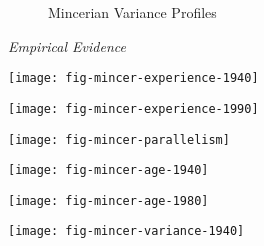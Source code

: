 \begin{frame}
\begin{figure}[htp]\centering
\caption{Mincerian Variance Profiles}\label{Mincerian Variance Profiles}
\end{figure}
\end{frame}

\begin{frame}\begin{center}
\LARGE\textit{Empirical Evidence}
\end{center}\end{frame}

\begin{frame}[plain]
\begin{center}
\texttt{[image: fig-mincer-experience-1940]}
\end{center}
\end{frame}

\begin{frame}[plain]
\begin{center}
\texttt{[image: fig-mincer-experience-1990]}
\end{center}
\end{frame}

\begin{frame}[plain]
\begin{center}
\texttt{[image: fig-mincer-parallelism]}
\end{center}
\end{frame}

\begin{frame}[plain]
\begin{center}
\texttt{[image: fig-mincer-age-1940]}
\end{center}
\end{frame}

\begin{frame}[plain]
\begin{center}
\texttt{[image: fig-mincer-age-1980]}
\end{center}
\end{frame}

\begin{frame}[plain]
\begin{center}
\texttt{[image: fig-mincer-variance-1940]}
\end{center}
\end{frame}

